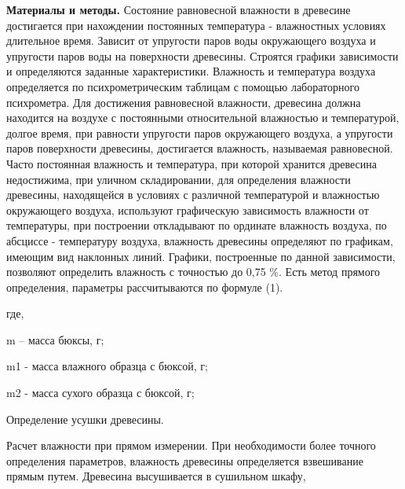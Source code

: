 {\bfseries Материалы и методы.} Состояние равновесной влажности в древесине
достигается при нахождении постоянных температура - влажностных условиях
длительное время. Зависит от упругости паров воды окружающего воздуха и
упругости паров воды на поверхности древесины. Строятся графики
зависимости и определяются заданные характеристики. Влажность и
температура воздуха определяется по психрометрическим таблицам с помощью
лабораторного психрометра. Для достижения равновесной влажности,
древесина должна находится на воздухе с постоянными относительной
влажностью и температурой, долгое время, при равности упругости паров
окружающего воздуха, а упругости паров поверхности древесины,
достигается влажность, называемая равновесной. Часто постоянная
влажность и температура, при которой хранится древесина недостижима, при
уличном складировании, для определения влажности древесины, находящейся
в условиях с различной температурой и влажностью окружающего воздуха,
используют графическую зависимость влажности от температуры, при
построении откладывают по ординате влажность воздуха, по абсциссе -
температуру воздуха, влажность древесины определяют по графикам, имеющим
вид наклонных линий. Графики, построенные по данной зависимости,
позволяют определить влажность с точностью до 0,75 \%. Есть метод
прямого определения, параметры рассчитываются по формуле (1).


где,

m -- масса бюксы, г;

m1 - масса влажного образца с бюксой, г;

m2 - масса сухого образца с бюксой, г;

Определение усушки древесины.

Расчет влажности при прямом измерении. При необходимости более точного
определения параметров, влажность древесины определяется взвешивание
прямым путем. Древесина высушивается в сушильном шкафу,

